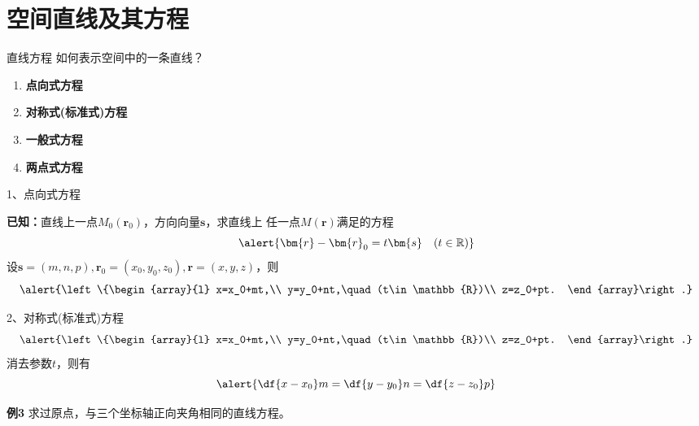 \section{空间直线及其方程}

\begin{frame}{直线方程}
	\linespread{1.5}\pause 
	如何表示空间中的一条直线？\pause 
	\begin{enumerate}
	  \item {\bf 点向式方程}\pause 
	  \item {\bf 对称式(标准式)方程}\pause 
	  \item {\bf 一般式方程}\pause 
	  \item {\bf 两点式方程}
	\end{enumerate}
\end{frame}

\begin{frame}{1、点向式方程}
	\linespread{1.2}\pause 
	\pause 
	
	{\bf 已知：}直线上一点$M_0(\bm{r}_0)$，方向向量$\bm{s}$，求直线上
	任一点$M(\bm{r})$满足的方程\pause 
	$$\alert{\bm{r}-\bm{r}_0=t\bm{s}\quad(t\in\mathbb{R})}$$\pause 
	设$\bm{s}=(m,n,p),\bm{r}_0=(x_0,y_0,z_0),\bm{r}=(x,y,z)$，\pause 则
	$$
		\alert{\left\{\begin{array}{l}
			x=x_0+mt,\\
			y=y_0+nt,\quad (t\in\mathbb{R})\\
			z=z_0+pt.
		\end{array}\right.}
	$$
\end{frame}

\begin{frame}{2、对称式(标准式)方程}
	\linespread{1.2}
	$$
		\alert{\left\{\begin{array}{l}
			x=x_0+mt,\\
			y=y_0+nt,\quad (t\in\mathbb{R})\\
			z=z_0+pt.
		\end{array}\right.}
	$$\pause 
	消去参数$t$，则有
	$$
		\alert{\df{x-x_0}m=\df{y-y_0}n=\df{z-z_0}p}
	$$\pause 
	\vspace{-1em}
	\begin{exampleblock}{{\bf 例3}\hfill}
		求过原点，与三个坐标轴正向夹角相同的直线方程。
	\end{exampleblock}
\end{frame}

